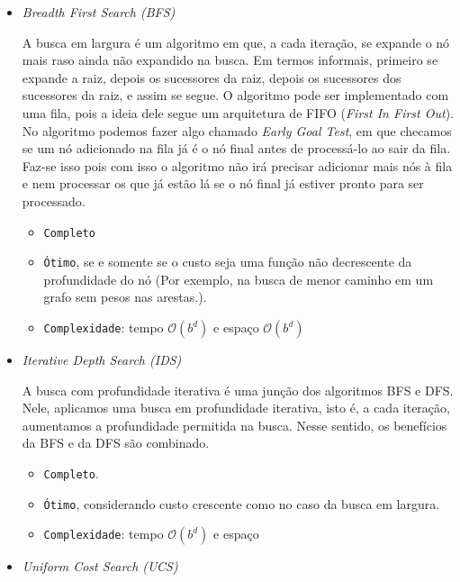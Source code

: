 \documentclass{article}
\begin{document}
\begin{itemize}
	\item \textit{Breadth First Search (BFS)}

	      A busca em largura é um algoritmo em que, a cada iteração,
	      se expande o nó mais raso ainda não expandido na busca. Em termos informais,
	      primeiro se expande a raiz, depois os sucessores da raiz, depois os sucessores
	      dos sucessores da raiz, e assim se segue. O algoritmo pode ser implementado
	      com uma fila, pois a ideia dele segue um arquitetura de FIFO (\textit{First In First Out}).
	      No algoritmo podemos fazer algo chamado \textit{Early Goal Test}, em que checamos se um nó adicionado na fila
	      já é o nó final antes de processá-lo ao sair da fila. Faz-se isso pois com isso
	      o algoritmo não irá precisar adicionar mais nós à fila e nem processar os que já estão lá se o nó final
	      já estiver pronto para ser processado.

	      \begin{itemize}
		      \item \texttt{Completo}
		      \item \texttt{Ótimo}, se e somente se o custo seja uma função
		            não decrescente da profundidade do nó (Por exemplo, na busca de menor caminho em
		            um grafo sem pesos nas arestas.).
		      \item \texttt{Complexidade}: tempo \(\mathcal{O}(b^d)\) e espaço \(\mathcal{O}(b^d)\)
	      \end{itemize}

	\item \textit{Iterative Depth Search (IDS)}

	      A busca com profundidade iterativa é uma junção dos algoritmos
	      BFS e DFS. Nele, aplicamos uma busca em profundidade iterativa, isto é, a cada iteração,
	      aumentamos a profundidade permitida na busca. Nesse sentido,
	      os benefícios da BFS e da DFS são combinado.

	      \begin{itemize}
		      \item \texttt{Completo}.
		      \item \texttt{Ótimo}, considerando custo crescente como no caso da busca em largura.
		      \item \texttt{Complexidade}: tempo \(\mathcal{O}(b^d)\) e espaço
	      \end{itemize}

	\item \textit{Uniform Cost Search (UCS)}


\end{itemize}
\end{document}
